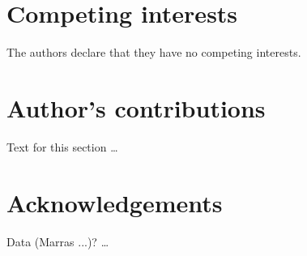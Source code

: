 \documentclass{bmcart}
\begin{document}

\begin{backmatter}

\section*{Competing interests}
  The authors declare that they have no competing interests.

\section*{Author's contributions}
    Text for this section \ldots

\section*{Acknowledgements}
  Data (Marras ...)? \ldots





\end{backmatter}
\end{document}

